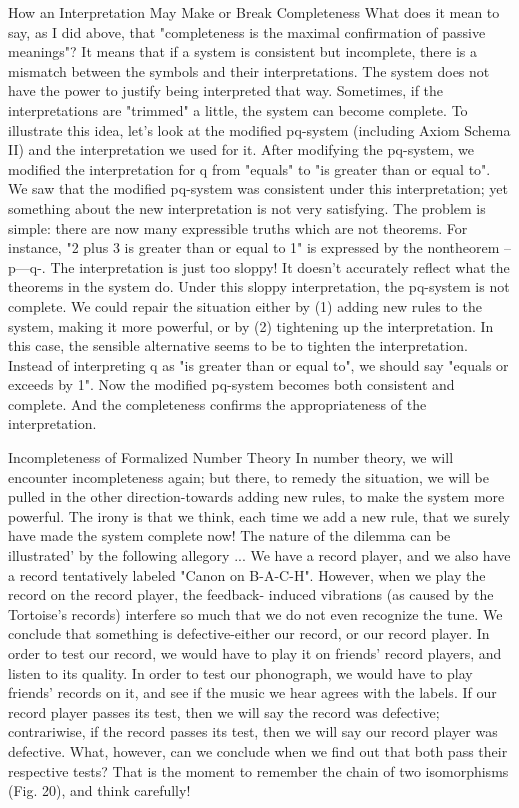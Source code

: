 How an Interpretation May Make or Break Completeness What does it mean to say, as I did above, that "completeness is the maximal confirmation of passive meanings"? It means that if a system is consistent but incomplete, there is a mismatch between the symbols and their interpretations. The system does not have the power to justify being interpreted that way. Sometimes, if the interpretations are "trimmed" a little, the system can become complete. To illustrate this idea, let's look at the modified pq-system (including Axiom Schema II) and the interpretation we used for it. After modifying the pq-system, we modified the interpretation for q from "equals" to "is greater than or equal to". We saw that the modified pq-system was consistent under this interpretation; yet something about the new interpretation is not very satisfying. The problem is simple: there are now many expressible truths which are not theorems. For instance, "2 plus 3 is greater than or equal to 1" is expressed by the nontheorem --p---q-. The interpretation is just too sloppy! It doesn't accurately reflect what the theorems in the system do. Under this sloppy interpretation, the pq-system is not complete. We could repair the situation either by (1) adding new rules to the system, making it more powerful, or by (2) tightening up the interpretation. In this case, the sensible alternative seems to be to tighten the interpretation. Instead of interpreting q as "is greater than or equal to", we should say "equals or exceeds by 1". Now the modified pq-system becomes both consistent and complete. And the completeness confirms the appropriateness of the interpretation. 

Incompleteness of Formalized Number Theory In number theory, we will encounter incompleteness again; but there, to remedy the situation, we will be pulled in the other direction-towards adding new rules, to make the system more powerful. The irony is that we think, each time we add a new rule, that we surely have made the system complete now! The nature of the dilemma can be illustrated' by the following allegory ... We have a record player, and we also have a record tentatively labeled "Canon on B-A-C-H". However, when we play the record on the record player, the feedback- induced vibrations (as caused by the Tortoise's records) interfere so much that we do not even recognize the tune. We conclude that something is defective-either our record, or our record player. In order to test our record, we would have to play it on friends' record players, and listen to its quality. In order to test our phonograph, we would have to play friends' records on it, and see if the music we hear agrees with the labels. If our record player passes its test, then we will say the record was defective; contrariwise, if the record passes its test, then we will say our record player was defective. What, however, can we conclude when we find out that both pass their respective tests? That is the moment to remember the chain of two isomorphisms (Fig. 20), and think carefully! 







